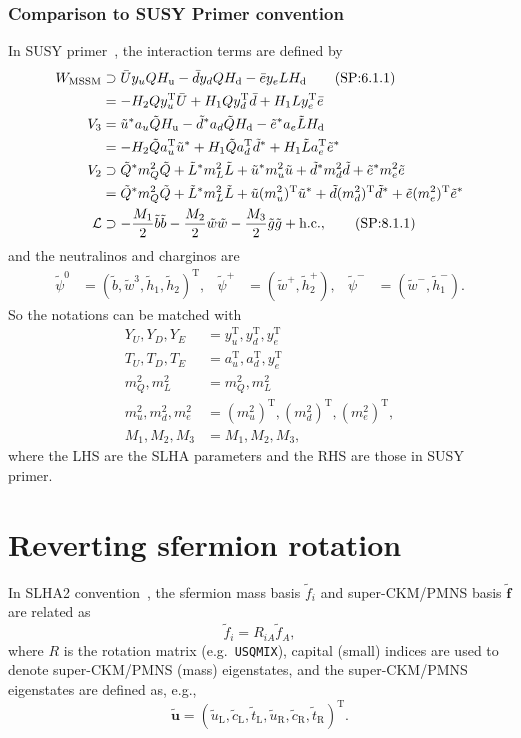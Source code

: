 \documentclass[a4paper,11pt,captions=tableheading,DIV=12]{scrartcl}
\newcommand\w[1]{_{\mathrm{#1}}}
\newcommand\vc[1]{{\boldsymbol{#1}}}
\newcommand{\tra}{^{\mathrm T}}
\begin{document}
\subsubsection{Comparison to SUSY Primer convention}
In SUSY primer~\cite{Martin:1997ns}, the interaction terms are defined by
\begin{align}
 W\w{MSSM}
&\supset \bar U y_u Q H\w u - \bar d y_d Q H\w d - \bar e y_e L H\w d
\tag{SP:6.1.1}\\
&=
 -H_2Q y_u\tra \bar U + H_1 Qy_d\tra\bar d  +H_1 Ly_e\tra\bar e
\notag\\
V_3 &=
 \tilde u^* a_u \tilde Q H\w u
-\tilde d^* a_d \tilde Q H\w d
-\tilde e^* a_e \tilde L H\w d
\notag\\
&=
-H_2 \tilde Q a_u\tra \tilde u^*
+H_1 \tilde Q a_d\tra \tilde d^*
+H_1 \tilde L a_e\tra \tilde e^*
\notag\\
V_2 &\supset
 \tilde Q^* m_Q^2 \tilde Q
+\tilde L^* m_L^2 \tilde L
+\tilde u^* m_u^2 \tilde u
+\tilde d^* m_d^2 \tilde d
+\tilde e^* m_e^2 \tilde e
\notag\\
&=
 \tilde Q^* m_Q^2 \tilde Q
+\tilde L^* m_L^2 \tilde L
+\tilde u (m_u^2)\tra \tilde u^*
+\tilde d (m_d^2)\tra \tilde d^*
+\tilde e (m_e^2)\tra \tilde e^*
\notag\\
\mathcal L&\supset
-\frac{M_1}{2}\tilde b\tilde b-\frac{M_2}{2}\tilde w\tilde w-\frac{M_3}{2}\tilde g\tilde g + \text{h.c.},\tag{SP:8.1.1}
\end{align}
and the neutralinos and charginos are
\begin{align}
 \tilde\psi^0&=(\tilde b,\tilde w^3,\tilde h_1,\tilde h_2)\tra,
&
\tilde\psi^+&=(\tilde w^+,\tilde h_2^+),
&
\tilde\psi^-&=(\tilde w^-,\tilde h_1^-).
\tag{SP:8.2.1+15}
\end{align}
So the notations can be matched with
\begin{align}
 Y_U, Y_D, Y_E &= y_u\tra, y_d\tra, y_e\tra\\
 T_U, T_D, T_E &= a_u\tra, a_d\tra, y_e\tra\\
 m_Q^2, m_L^2  &= m_Q^2, m_L^2\\
 m_u^2, m_d^2, m_e^2  &= (m_u^2)\tra,(m_d^2)\tra,(m_e^2)\tra,\\
 M_1, M_2, M_3 &= M_1, M_2, M_3,
\end{align}
where the LHS are the SLHA parameters and the RHS are those in SUSY primer.


\section{Reverting sfermion rotation}
In SLHA2 convention~\cite{SLHA2}, the sfermion mass basis $\tilde f_i$ and super-CKM/PMNS basis $\tilde{\vc f}$ are related as
\begin{equation}
 \tilde f_i = R_{iA}\tilde f_A,
\end{equation}
where $R$ is the rotation matrix (e.g.~\texttt{USQMIX}), capital (small) indices are used to denote super-CKM/PMNS (mass) eigenstates, and
the super-CKM/PMNS eigenstates are defined as, e.g.,
\begin{equation}
 \tilde {\vc u} = (
\tilde u\w L, \tilde c\w L, \tilde t\w L,
\tilde u\w R, \tilde c\w R, \tilde t\w R)\tra.
\end{equation}
\end{document}

